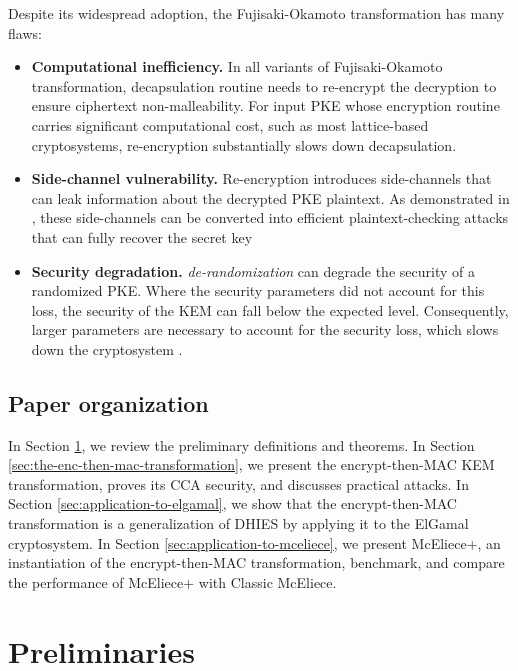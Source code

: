 \documentclass[runningheads]{llncs}
\begin{document}
Despite its widespread adoption, the Fujisaki-Okamoto transformation has many flaws: \begin{itemize}
    \item \textbf{Computational inefficiency.} In all variants of Fujisaki-Okamoto transformation, decapsulation routine needs to re-encrypt the decryption to ensure ciphertext non-malleability. For input PKE whose encryption routine carries significant computational cost, such as most lattice-based cryptosystems, re-encryption substantially slows down decapsulation.
    \item \textbf{Side-channel vulnerability.} Re-encryption introduces side-channels that can leak information about the decrypted PKE plaintext. As demonstrated in \cite{DBLP:journals/tches/UenoXTITH22,DBLP:journals/tches/TanakaUXITH23,DBLP:conf/acns/Huguenin-Dumittan20}, these side-channels can be converted into efficient plaintext-checking attacks that can fully recover the secret key
    \item \textbf{Security degradation.} \textit{de-randomization} can degrade the security of a randomized PKE. Where the security parameters did not account for this loss, the security of the KEM can fall below the expected level. Consequently, larger parameters are necessary to account for the security loss, which slows down the cryptosystem \cite{cryptoeprint:2021/912,DBLP:journals/iacr/Bernstein21}.
\end{itemize}

\subsection{Paper organization}\label{sec:paper-organization}
In Section \ref{sec:preliminaries}, we review the preliminary definitions and theorems. In Section \ref{sec:the-enc-then-mac-transformation}, we present the encrypt-then-MAC KEM transformation, proves its CCA security, and discusses practical attacks. In Section \ref{sec:application-to-elgamal}, we show that the encrypt-then-MAC transformation is a generalization of DHIES by applying it to the ElGamal cryptosystem. In Section \ref{sec:application-to-mceliece}, we present McEliece+, an instantiation of the encrypt-then-MAC transformation, benchmark, and compare the performance of McEliece+ with Classic McEliece.

\section{Preliminaries}\label{sec:preliminaries}
\end{document}
